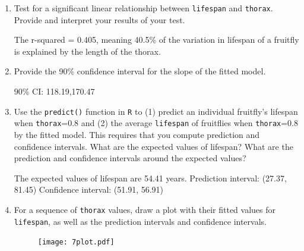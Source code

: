 \documentclass[12pt,letterpaper]{article}
\begin{document}
\begin{enumerate}
	\vspace{.5cm}
		
	\item
	Test for a significant linear relationship between  \texttt{lifespan} and \texttt{thorax}. Provide and interpret your results of your test.
	
	The r-squared = 0.405, meaning 40.5\% of the variation in lifespan of a fruitfly is explained by the length of the thorax. 

	\vspace{.5cm}
	
	\item
	
	Provide the 90\% confidence interval for the slope of the fitted model.
	
	
	90\% CI: 118.19,170.47
	
			\vspace{.5cm}
			
			
	\item Use the \texttt{predict()} function in \texttt{R} to (1) predict an individual fruitfly's lifespan when \texttt{thorax}=0.8 and (2) the average \texttt{lifespan} of fruitflies when \texttt{thorax}=0.8 by the fitted model. This requires that you compute prediction and confidence intervals. What are the expected values of lifespan? What are the prediction and confidence intervals around the expected values? 
	
	
	The expected values of lifespan are 54.41 years. 
	\vspace{.15cm}
	Prediction interval: (27.37, 81.45)
	\vspace{.15cm}
	Confidence interval: (51.91, 56.91)
	
	\vspace{.5cm}
	
	\item	For a sequence of \texttt{thorax} values, draw a plot with their fitted values for \texttt{lifespan}, as well as the prediction intervals and confidence intervals.

\begin{figure}[h!]\centering
		\label{fig:plot_2}
	\texttt{[image: 7plot.pdf]}
		\end{figure}



\end{enumerate}
\end{document}
